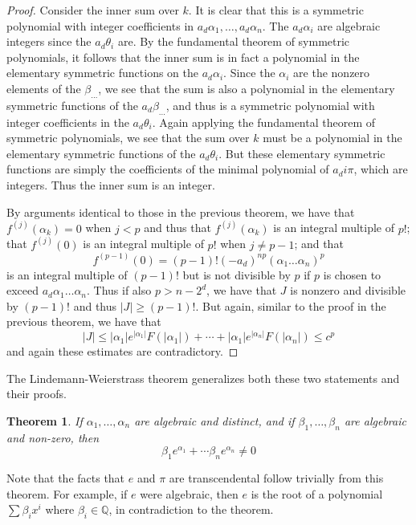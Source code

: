 \documentclass[12pt]{article}
\newcommand{\fdiff}[2]{f^{(#1)}(#2)}
\newtheorem{thm}{Theorem}
\newcommand{\Rats}{\mathbb{Q}}
\begin{document}
\begin{proof}
Consider the inner sum over $k$. It is clear that this is a symmetric polynomial with integer coefficients in $a_d \alpha_1,\ldots,a_d\alpha_n$. The $a_d \alpha_i$ are algebraic integers since the $a_d \theta_i$ are. By the fundamental theorem of symmetric polynomials, it follows that the inner sum is in fact a polynomial in the elementary symmetric functions on the $a_d\alpha_i$. Since the $\alpha_i$ are the nonzero elements of the $\beta_{\ldots}$, we see that the sum is also a polynomial in the elementary symmetric functions of the $a_d\beta_{\ldots}$, and thus is a symmetric polynomial with integer coefficients in the $a_d\theta_i$. Again applying the fundamental theorem of symmetric polynomials, we see that the sum over $k$ must be a polynomial in the elementary symmetric functions of the $a_d\theta_i$. But these elementary symmetric functions are simply the coefficients of the minimal polynomial of $a_di\pi$, which are integers. Thus the inner sum is an integer.

By arguments identical to those in the previous theorem, we have that $\fdiff j{\alpha_k}=0$ when $j<p$ and thus that $\fdiff j{\alpha_k}$ is an integral multiple of $p!$; that $\fdiff j0$ is an integral multiple of $p!$ when $j\neq p-1$; and that
\[\fdiff {p-1}{0} = (p-1)!(-a_d)^{np}(\alpha_1\ldots\alpha_n)^p\]
is an integral multiple of $(p-1)!$ but is not divisible by $p$ if $p$ is chosen to exceed $a_d \alpha_1\ldots\alpha_n$. Thus if also $p>n-2^d$, we have that $J$ is nonzero and divisible by $(p-1)!$ and thus $\lvert J\rvert\geq (p-1)!$. But again, similar to the proof in the previous theorem, we have that
\[\lvert J\rvert\leq 
\lvert\alpha_1\rvert e^{\lvert\alpha_1\rvert}F(\lvert\alpha_1\rvert)+\cdots+
\lvert\alpha_1\rvert e^{\lvert\alpha_n\rvert}F(\lvert\alpha_n\rvert)\leq c^p\]
and again these estimates are contradictory.
\end{proof}

The Lindemann-Weierstrass theorem generalizes both these two statements and their proofs.
\begin{thm}\label{thm:three}
If $\alpha_1,\ldots,\alpha_n$ are algebraic and distinct, and if $\beta_1,\ldots,\beta_n$ are algebraic and non-zero, then
\[\beta_1 e^{\alpha_1}+\cdots\beta_n e^{\alpha_n}\neq 0\]
\end{thm}

Note that the facts that $e$ and $\pi$ are transcendental follow trivially from this theorem. For example, if $e$ were algebraic, then $e$ is the root of a polynomial $\sum \beta_i x^i$ where $\beta_i\in\Rats$, in contradiction to the theorem.
\end{document}
